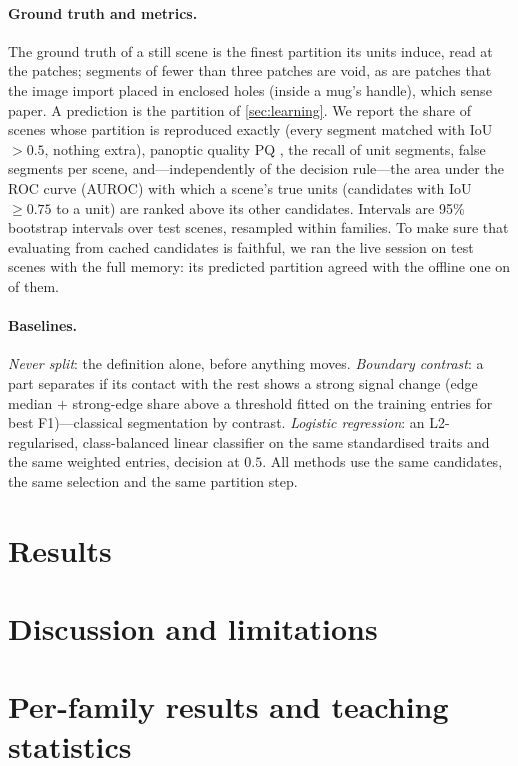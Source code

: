 \documentclass[10pt]{article}
\begin{document}
\paragraph{Ground truth and metrics.} The ground truth of a still scene is the finest partition its units induce, read at the patches; segments of fewer than three patches are void, as are patches that the image import placed in enclosed holes (inside a mug's handle), which sense paper. A prediction is the partition of \cref{sec:learning}. We report the share of scenes whose partition is reproduced exactly (every segment matched with IoU $>0.5$, nothing extra), panoptic quality PQ \citep{kirillov2019panoptic}, the recall of unit segments, false segments per scene, and---independently of the decision rule---the area under the ROC curve (AUROC) with which a scene's true units (candidates with IoU $\ge0.75$ to a unit) are ranked above its other candidates. Intervals are 95\% bootstrap intervals over test scenes, resampled within families. To make sure that evaluating from cached candidates is faithful, we ran the live session on \nEquivTotal{} test scenes with the full memory: its predicted partition agreed with the offline one on \nEquivAgree{} of them.

\paragraph{Baselines.} \emph{Never split}: the definition alone, before anything moves. \emph{Boundary contrast}: a part separates if its contact with the rest shows a strong signal change (edge median $+$ strong-edge share above a threshold fitted on the training entries for best F1)---classical segmentation by contrast. \emph{Logistic regression}: an L2-regularised, class-balanced linear classifier on the same standardised traits and the same weighted entries, decision at $0.5$. All methods use the same candidates, the same selection and the same partition step.

\section{Results}
\label{sec:results}



\section{Discussion and limitations}
\label{sec:discussion}






\appendix
\section{Per-family results and teaching statistics}
\label{app:families}

\end{document}
